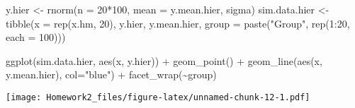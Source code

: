 \documentclass[
]{article}
\newenvironment{Shaded}{\begin{snugshade}}{\end{snugshade}}
\newcommand{\AttributeTok}[1]{\textcolor[rgb]{0.77,0.63,0.00}{#1}}
\newcommand{\DecValTok}[1]{\textcolor[rgb]{0.00,0.00,0.81}{#1}}
\newcommand{\FunctionTok}[1]{\textcolor[rgb]{0.00,0.00,0.00}{#1}}
\newcommand{\NormalTok}[1]{#1}
\newcommand{\OtherTok}[1]{\textcolor[rgb]{0.56,0.35,0.01}{#1}}
\newcommand{\SpecialCharTok}[1]{\textcolor[rgb]{0.00,0.00,0.00}{#1}}
\newcommand{\StringTok}[1]{\textcolor[rgb]{0.31,0.60,0.02}{#1}}
\begin{document}
\begin{Shaded}
\begin{Highlighting}[]
\NormalTok{y.hier }\OtherTok{\textless{}{-}} \FunctionTok{rnorm}\NormalTok{(}\AttributeTok{n =} \DecValTok{20}\SpecialCharTok{*}\DecValTok{100}\NormalTok{, }\AttributeTok{mean =}\NormalTok{ y.mean.hier, sigma)}
\NormalTok{sim.data.hier }\OtherTok{\textless{}{-}} \FunctionTok{tibble}\NormalTok{(}\AttributeTok{x =} \FunctionTok{rep}\NormalTok{(x.hm, }\DecValTok{20}\NormalTok{), }
\NormalTok{                        y.hier, y.mean.hier, }
                        \AttributeTok{group =} \FunctionTok{paste}\NormalTok{(}\StringTok{"Group"}\NormalTok{, }\FunctionTok{rep}\NormalTok{(}\DecValTok{1}\SpecialCharTok{:}\DecValTok{20}\NormalTok{, }\AttributeTok{each =} \DecValTok{100}\NormalTok{)))}

\FunctionTok{ggplot}\NormalTok{(sim.data.hier, }\FunctionTok{aes}\NormalTok{(x, y.hier)) }\SpecialCharTok{+} 
  \FunctionTok{geom\_point}\NormalTok{() }\SpecialCharTok{+} \FunctionTok{geom\_line}\NormalTok{(}\FunctionTok{aes}\NormalTok{(x, y.mean.hier), }\AttributeTok{col=}\StringTok{"blue"}\NormalTok{) }\SpecialCharTok{+} 
  \FunctionTok{facet\_wrap}\NormalTok{(}\SpecialCharTok{\textasciitilde{}}\NormalTok{group)}
\end{Highlighting}
\end{Shaded}

\texttt{[image: Homework2\_files/figure-latex/unnamed-chunk-12-1.pdf]}
\end{document}

